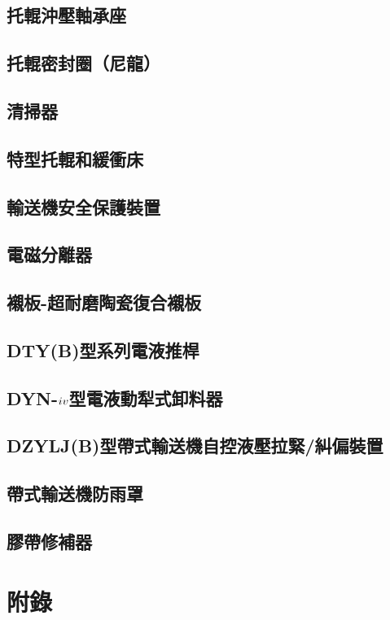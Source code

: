 \documentclass[UTF8]{ctexart}
\newcommand{\Rmnum}[1]{\uppercase\expandafter{\romannumeral #1}}
\begin{document}
\subsection{托輥沖壓軸承座}
\subsection{托輥密封圈（尼龍）}
\subsection{清掃器}
\subsection{特型托輥和緩衝床}
\subsection{輸送機安全保護裝置}
\subsection{電磁分離器}
\subsection{襯板-超耐磨陶瓷復合襯板}
\subsection{DTY(B)型系列電液推桿}
\subsection{DYN-$\Rmnum{4}$型電液動犁式卸料器}
\subsection{DZYLJ(B)型帶式輸送機自控液壓拉緊/糾偏裝置}
\subsection{帶式輸送機防雨罩}
\subsection{膠帶修補器}




\newpage
\section{附錄}
\end{document}
